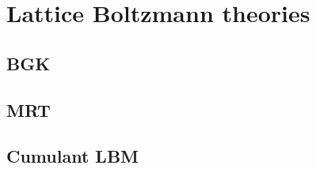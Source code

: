 \newpage

\section{Lattice Boltzmann theories}

\subsection{BGK}
\subsection{MRT}
\subsection{Cumulant LBM}